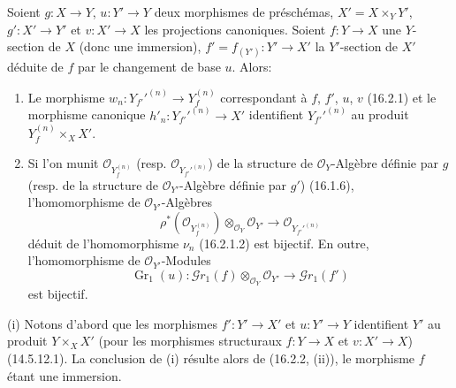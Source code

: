 \begin{corollary}[16.2.3]
\label{IV.16.2.3}
Soient $g:X\to Y$, $u:Y'\to Y$ deux morphismes de préschémas,
$X'=X\times_Y Y'$, $g':X'\to Y'$ et $v:X'\to X$ les projections canoniques.
Soient $f:Y\to X$ une $Y$-section de $X$ (donc une immersion),
$f'=f_{(Y')}:Y'\to X'$ la $Y'$-section de $X'$ déduite de $f$ par le
changement de base $u$. Alors:
\begin{enumerate}
\item[\textup{(i)}] Le morphisme
$w_n:Y_{f'}'^{(n)}\to Y_f^{(n)}$ correspondant à $f$, $f'$, $u$, $v$
\textup{(16.2.1)} et le morphisme canonique
$h'_n:Y_{f'}'^{(n)}\to X'$ identifient $Y_{f'}'^{(n)}$ au produit
$Y_f^{(n)}\times_X X'$.
\item[\textup{(ii)}] Si l'on munit $\mathcal{O}_{Y_f^{(n)}}$ \textup{(resp.}
$\mathcal{O}_{Y_{f'}'^{(n)}}$\textup{)} de la structure de $\mathcal{O}_Y$-Algèbre
définie par $g$ \textup{(resp.} de la structure de $\mathcal{O}_{Y'}$-Algèbre définie
par $g'$\textup{)} \textup{(16.1.6)}, l'homomorphisme de $\mathcal{O}_{Y'}$-Algèbres
\[
  \rho^*(\mathcal{O}_{Y_f^{(n)}})
  \otimes_{\mathcal{O}_Y}\mathcal{O}_{Y'}
  \longrightarrow
  \mathcal{O}_{Y_{f'}'^{(n)}}
  \tag{16.2.3.1}
  \label{IV.16.2.3.1}
\]
déduit de l'homomorphisme $\nu_n$ \textup{(16.2.1.2)} est bijectif. En outre,
l'homomorphisme de $\mathcal{O}_{Y'}$-Modules
\[
  \operatorname{Gr}_1(u):
  \mathscr{G}r_1(f)\otimes_{\mathcal{O}_Y}\mathcal{O}_{Y'}
  \longrightarrow\mathscr{G}r_1(f')
  \tag{16.2.3.2}
  \label{IV.16.2.3.2}
\]
est bijectif.
\end{enumerate}
\end{corollary}

\noindent(i) Notons d'abord que les morphismes $f':Y'\to X'$ et $u:Y'\to Y$
identifient $Y'$ au produit $Y\times_X X'$ (pour les morphismes structuraux
$f:Y\to X$ et $v:X'\to X$) (14.5.12.1). La conclusion de (i) résulte alors de
(16.2.2, (ii)), le morphisme $f$ étant une immersion.

